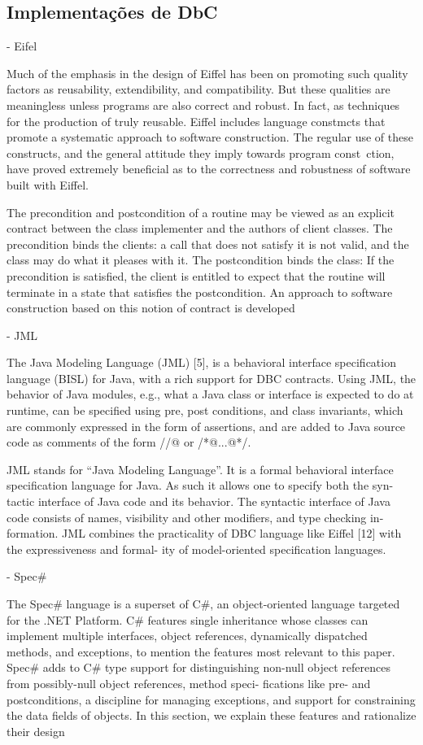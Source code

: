 \subsection{Implementações de DbC}

 - Eifel

Much of the emphasis in the design of Eiffel has been on
promoting such quality factors as reusability, extendibility,
and compatibility. But these qualities are meaningless
unless programs are also correct and robust. In fact,
as techniques for the production of truly reusable.
 Eiffel includes language constmcts that promote a
systematic approach to software construction. The regular
use of these constructs, and the general attitude they
imply towards program const~ction, have proved extremely
beneficial as to the correctness and robustness of
software built with Eiffel. 

The precondition and postcondition of a routine may
be viewed as an explicit contract between the class
implementer and the authors of client classes. The
precondition binds the clients: a call that does not satisfy
it is not valid, and the class may do what it pleases with
it. The postcondition binds the class: If the precondition
is satisfied, the client is entitled to expect that the routine
will terminate in a state that satisfies the postcondition.
An approach to software construction based on this
notion of contract is developed
\cite{meyer1988eiffel}

 - JML
 
 The Java Modeling Language
(JML) [5], is a behavioral interface specification language
(BISL) for Java, with a rich support for DBC contracts. Using
JML, the behavior of Java modules, e.g., what a Java class or
interface is expected to do at runtime, can be specified using
pre, post conditions, and class invariants, which are commonly
expressed in the form of assertions, and are added to Java
source code as comments of the form //@ or /*@...@*/.
 
 JML stands for “Java Modeling Language”. It is a
formal behavioral interface specification language for Java. As such it allows one to specify both the syn-
tactic interface of Java code and its behavior. The
syntactic interface of Java code consists of names,
visibility and other modifiers, and type checking in-
formation.
JML combines the practicality of DBC language
like Eiffel [12] with the expressiveness and formal-
ity of model-oriented specification languages.
\cite{leavens2006design} 
 
 - Spec\#

The Spec# language is a superset of C\#, an object-oriented language targeted
for the .NET Platform. C\# features single inheritance whose classes can
implement multiple interfaces, object references, dynamically dispatched methods, and exceptions, to mention
the features most relevant to this paper. Spec# adds to C\# type support for
distinguishing non-null object references from possibly-null object references, method speci-
fications like pre- and postconditions, a discipline for managing exceptions, and support
for constraining the data fields of objects. In this section, we explain these features and
rationalize their design
\cite{barnett2004spec}




